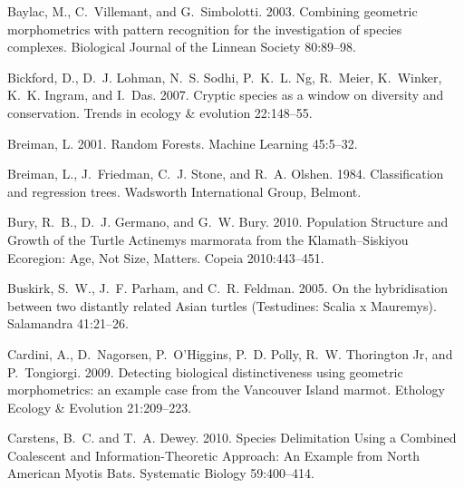 \documentclass[12pt,letterpaper]{article}
\begin{document}
\begin{thebibliography}{77}
    Baylac, M., C.~Villemant, and G.~Simbolotti. 2003. {Combining geometric
      morphometrics with pattern recognition for the investigation of species
    complexes}. Biological Journal of the Linnean Society 80:89--98.

    Bickford, D., D.~J. Lohman, N.~S. Sodhi, P.~K.~L. Ng, R.~Meier, K.~Winker,
    K.~K. Ingram, and I.~Das. 2007. {Cryptic species as a window on diversity and
    conservation.} Trends in ecology \& evolution 22:148--55.

    Breiman, L. 2001. {Random Forests}. Machine Learning 45:5--32.

    Breiman, L., J.~Friedman, C.~J. Stone, and R.~A. Olshen. 1984. {Classification
    and regression trees}. Wadsworth International Group, Belmont.

    Bury, R.~B., D.~J. Germano, and G.~W. Bury. 2010. {Population Structure and
      Growth of the Turtle Actinemys marmorata from the Klamath–Siskiyou
    Ecoregion: Age, Not Size, Matters}. Copeia 2010:443--451.

    Buskirk, S.~W., J.~F. Parham, and C.~R. Feldman. 2005. {On the hybridisation
    between two distantly related Asian turtles (Testudines: Scalia x Mauremys)}.
    Salamandra 41:21--26.

    Cardini, A., D.~Nagorsen, P.~O'Higgins, P.~D. Polly, R.~W. {Thorington Jr}, and
    P.~Tongiorgi. 2009. {Detecting biological distinctiveness using geometric
    morphometrics: an example case from the Vancouver Island marmot}. Ethology
    Ecology \& Evolution 21:209--223.

    Carstens, B.~C. and T.~A. Dewey. 2010. {Species Delimitation Using a Combined
      Coalescent and Information-Theoretic Approach: An Example from North American
    Myotis Bats}. Systematic Biology 59:400--414.


\end{thebibliography}
\end{document}
